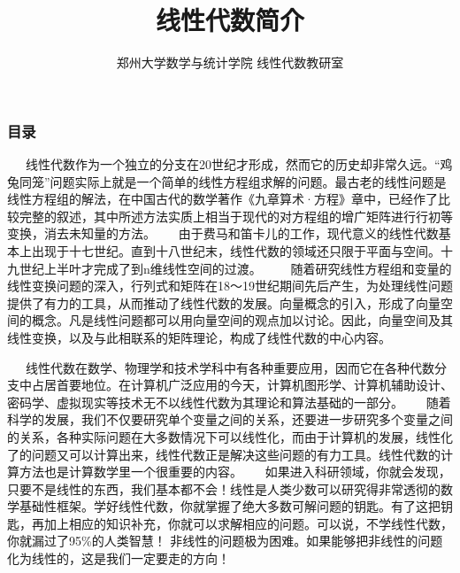 \documentclass[compress,mathserif,cjk]{beamer}
\title{\textsc{线性代数简介}}
\author{郑州大学数学与统计学院 线性代数教研室}
\date{}
\theoremstyle{remark}
\numberwithin{equation}{section}
\newcommand{\xiaoerhao}{\fontsize{18pt}{\baselineskip}\selectfont}  %
\begin{document}
\begin{CJK}{UTF8}{gbsn}
\frame{\titlepage}

\begin{frame}\frametitle{目录}
 \tableofcontents
\end{frame}

\begin{frame}{}
 \ \ \ 线性代数作为一个独立的分支在20世纪才形成，然而它的历史却非常久远。“鸡兔同笼”问题实际上就是一个简单的线性方程组求解的问题。最古老的线性问题是线性方程组的解法，在中国古代的数学著作《九章算术·方程》章中，已经作了比较完整的叙述，其中所述方法实质上相当于现代的对方程组的增广矩阵进行行初等变换，消去未知量的方法。
  \vskip10pt\pause
 \ \ \ 由于费马和笛卡儿的工作，现代意义的线性代数基本上出现于十七世纪。直到十八世纪末，线性代数的领域还只限于平面与空间。十九世纪上半叶才完成了到n维线性空间的过渡。
  \vskip10pt\pause
 \ \ \ \ 随着研究线性方程组和变量的线性变换问题的深入，行列式和矩阵在18〜19世纪期间先后产生，为处理线性问题提供了有力的工具，从而推动了线性代数的发展。向量概念的引入，形成了向量空间的概念。凡是线性问题都可以用向量空间的观点加以讨论。因此，向量空间及其线性变换，以及与此相联系的矩阵理论，构成了线性代数的中心内容。
 

 
 
\end{frame}

\begin{frame}{}
 \ \ \ 线性代数在数学、物理学和技术学科中有各种重要应用，因而它在各种代数分支中占居首要地位。在计算机广泛应用的今天，计算机图形学、计算机辅助设计、密码学、虚拟现实等技术无不以线性代数为其理论和算法基础的一部分。
 \vskip10pt\pause
 \ \ \ 随着科学的发展，我们不仅要研究单个变量之间的关系，还要进一步研究多个变量之间的关系，各种实际问题在大多数情况下可以线性化，而由于计算机的发展，线性化了的问题又可以计算出来，线性代数正是解决这些问题的有力工具。线性代数的计算方法也是计算数学里一个很重要的内容。
 \vskip10pt\pause
 \ \ \ 如果进入科研领域，你就会发现，只要不是线性的东西，我们基本都不会！线性是人类少数可以研究得非常透彻的数学基础性框架。学好线性代数，你就掌握了绝大多数可解问题的钥匙。有了这把钥匙，再加上相应的知识补充，你就可以求解相应的问题。\pause 可以说，{\color{red}不学线性代数，你就漏过了95\%的人类智慧！} 非线性的问题极为困难。如果能够把非线性的问题化为线性的，这是我们一定要走的方向！
\end{frame}



\begin{frame}
\begin{center}
{\textcolor[rgb]{0.50,0.00,1.00}{\textbf{\xiaoerhao{Thanks for your attention!}}}}\bigskip
\end{center}
\end{frame}
\end{CJK}
\end{document}
